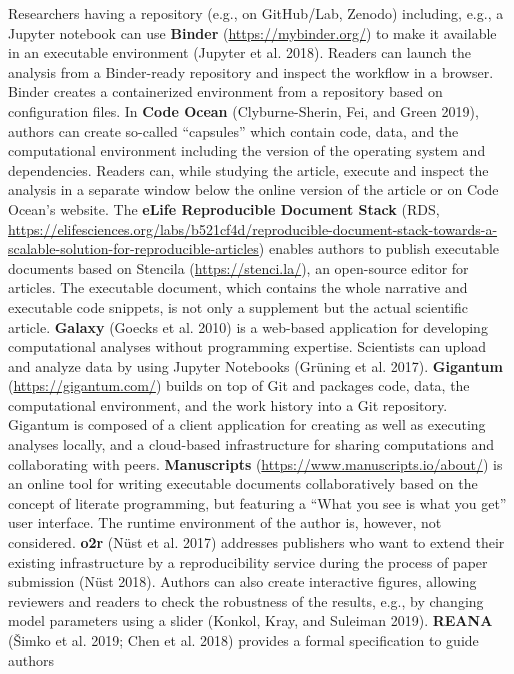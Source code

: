 \documentclass[onecolumn]{article}
\begin{document}
Researchers having a repository (e.g., on GitHub/Lab, Zenodo) including,
e.g., a Jupyter notebook can use \textbf{Binder}
(\url{https://mybinder.org/}) to make it available in an executable
environment (Jupyter et al. 2018). Readers can launch the analysis from
a Binder-ready repository and inspect the workflow in a browser. Binder
creates a containerized environment from a repository based on
configuration files. In \textbf{Code Ocean} (Clyburne-Sherin, Fei, and
Green 2019), authors can create so-called ``capsules'' which contain
code, data, and the computational environment including the version of
the operating system and dependencies. Readers can, while studying the
article, execute and inspect the analysis in a separate window below the
online version of the article or on Code Ocean's website. The
\textbf{eLife Reproducible Document Stack} (RDS,
\url{https://elifesciences.org/labs/b521cf4d/reproducible-document-stack-towards-a-scalable-solution-for-reproducible-articles})
enables authors to publish executable documents based on Stencila
(\url{https://stenci.la/}), an open-source editor for articles. The
executable document, which contains the whole narrative and executable
code snippets, is not only a supplement but the actual scientific
article. \textbf{Galaxy} (Goecks et al. 2010) is a web-based application
for developing computational analyses without programming expertise.
Scientists can upload and analyze data by using Jupyter Notebooks
(Grüning et al. 2017). \textbf{Gigantum} (\url{https://gigantum.com/})
builds on top of Git and packages code, data, the computational
environment, and the work history into a Git repository. Gigantum is
composed of a client application for creating as well as executing
analyses locally, and a cloud-based infrastructure for sharing
computations and collaborating with peers. \textbf{Manuscripts}
(\url{https://www.manuscripts.io/about/}) is an online tool for writing
executable documents collaboratively based on the concept of literate
programming, but featuring a ``What you see is what you get'' user
interface. The runtime environment of the author is, however, not
considered. \textbf{o2r} (Nüst et al. 2017) addresses publishers who
want to extend their existing infrastructure by a reproducibility
service during the process of paper submission (Nüst 2018). Authors can
also create interactive figures, allowing reviewers and readers to check
the robustness of the results, e.g., by changing model parameters using
a slider (Konkol, Kray, and Suleiman 2019). \textbf{REANA} (Šimko et al.
2019; Chen et al. 2018) provides a formal specification to guide authors
\end{document}
